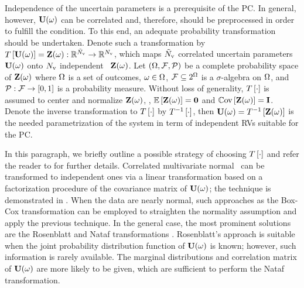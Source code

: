 Independence of the uncertain parameters is a prerequisite of the PC. In general, however, $\mathbf{U}(\omega)$ can be correlated and, therefore, should be preprocessed in order to fulfill the condition. To this end, an adequate probability transformation should be undertaken. Denote such a transformation by $T\left[\mathbf{U}(\omega)\right] = \mathbf{Z}(\omega): \mathbb{R}^{\tilde{N}_\text{v}} \to \mathbb{R}^{N_\text{v}}$, which maps ${\tilde{N}_\text{v}}$ correlated uncertain parameters $\mathbf{U}(\omega)$ onto ${N_\text{v}}$ independent \rvs\ $\mathbf{Z}(\omega)$. Let $(\Omega, \mathcal{F}, \mathcal{P})$ be a complete probability space \cite{maitre2010} of $\mathbf{Z}(\omega)$ where $\Omega$ is a set of outcomes, $\omega \in \Omega$, $\mathcal{F} \subseteq 2^\Omega$ is a $\sigma$-algebra on $\Omega$, and $\mathcal{P}: \mathcal{F} \to [0, 1]$ is a probability measure. Without loss of generality, $T\left[\cdot\right]$ is assumed to center and normalize $\mathbf{Z}(\omega)$, \ie, $\oExp{\vZ(\o)} = \mZero$ and $\oCov{\vZ(\o)} = \mI$. Denote the inverse transformation to $T\left[\cdot\right]$ by $T^{-1}\left[\cdot\right]$, then $\mathbf{U}(\omega) = T^{-1}\left[\mathbf{Z}(\omega)\right]$ is the needed parametrization of the system in term of independent RVs suitable for the PC.

In this paragraph, we briefly outline a possible strategy of choosing $T\left[\cdot\right]$ and refer the reader to \cite{xiu2010, eldred2009} for further details. Correlated multivariate normal \rvs\ can be transformed to independent ones via a linear transformation based on a factorization procedure of the covariance matrix of $\mathbf{U}(\omega)$; the technique is demonstrated in . When the data are nearly normal, such approaches as the Box-Cox transformation can be employed to straighten the normality assumption and apply the previous technique. In the general case, the most prominent solutions are the Rosenblatt and Nataf transformations \cite{eldred2009}. Rosenblatt's approach is suitable when the joint probability distribution function of $\mathbf{U}(\omega)$ is known; however, such information is rarely available. The marginal distributions and correlation matrix of $\mathbf{U}(\omega)$ are more likely to be given, which are sufficient to perform the Nataf transformation.
